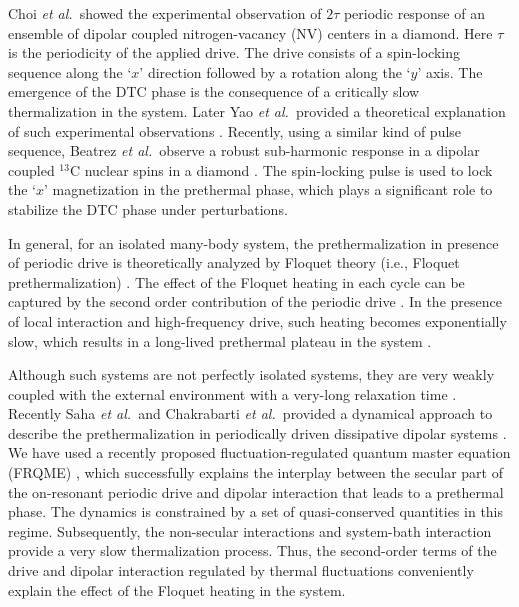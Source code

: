 \documentclass[prl,aps,preprint,floatfix]{revtex4-2}
\newcommand{\etal}{\textit{et al.\ }}
\begin{document}
Choi \etal showed the experimental observation of $2\tau$ periodic response of an ensemble of dipolar
coupled nitrogen-vacancy (NV) centers in a diamond. Here $\tau$ is the periodicity of the applied drive. The
drive consists of a spin-locking sequence along the `$x$' direction followed by a rotation along the `$y$'
axis. The emergence of the DTC phase is the consequence of a critically slow thermalization in the system.
Later Yao \etal provided a theoretical explanation of such experimental observations
\cite{ho_critical_2017}. Recently, using a similar kind of pulse sequence, Beatrez \etal observe a robust
sub-harmonic response in a dipolar coupled $^{13}$C nuclear spins in a diamond \cite{beatrez_critical_2023}.
The spin-locking pulse is used to lock the `$x$' magnetization in the prethermal
phase\cite{beatrez_floquet_2021}, which plays a significant role to stabilize the DTC phase under
perturbations. 

In general, for an isolated many-body system, the prethermalization in presence of periodic drive is
theoretically analyzed by  Floquet theory (i.e., Floquet prethermalization)
\cite{beatrez_floquet_2021,kuwahara_floquetmagnus_2016,bukov_prethermal_2015,rubio-abadal_floquet_2020,yin_prethermal_2021,holthaus_floquet_2016}.
The effect of the Floquet heating in each cycle can be captured by the second order contribution of the
periodic drive \cite{rubio-abadal_floquet_2020}. In the presence of local interaction and high-frequency
drive, such heating becomes exponentially slow, which results in a long-lived prethermal plateau in the
system \cite{Abanin2015}.  

 Although such systems are not perfectly isolated systems, they are very weakly coupled with the external
environment with a very-long relaxation time \cite{beatrez_floquet_2021,peng_floquet_2021}.  Recently Saha
\etal and Chakrabarti \etal provided a dynamical approach to describe the prethermalization in periodically
driven dissipative dipolar systems \cite{saha_cascaded_2023,chakrabarti_2022_creation}. We have used a
recently proposed fluctuation-regulated quantum master equation (FRQME) \cite{chakrabarti2018b}, which
successfully explains the interplay between the secular part of the on-resonant periodic drive and dipolar
interaction that leads to a prethermal phase. The dynamics is constrained by a set of quasi-conserved
quantities in this regime.  Subsequently, the non-secular interactions and system-bath interaction provide a
very slow thermalization process. Thus, the second-order terms of the drive and dipolar interaction
regulated by thermal fluctuations conveniently explain the effect of the Floquet heating in the system. 
\end{document}
